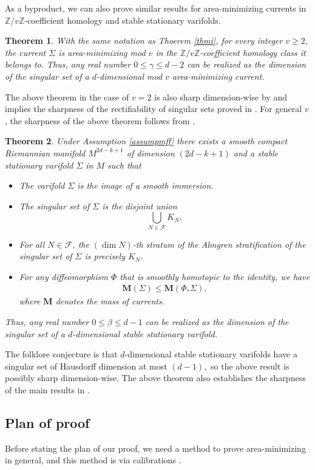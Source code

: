 \documentclass[11pt,a4paper]{amsart}
\numberwithin{equation}{section}
\newcommand{\mff}{\mathcal{F}}
\newcommand{\be}{\beta}
\newcommand{\ga}{\gamma}
\newcommand{\Si}{\Sigma}
\newcommand{\ms}{\mathbf{M}}
\newcommand{\pf}{_\ast}
\newcommand{\Z}{\mathbb{Z}}
\theoremstyle{plain}
\newtheorem{thm}{Theorem}
\theoremstyle{definition}
\numberwithin{equation}{subsection}
\begin{document}
As a byproduct, we can also prove similar results for area-minimizing currents in $\Z/v\Z$-coefficient homology and stable stationary varifolds. 
\begin{thm}\label{thmp}
With the same notation as Thoerem \ref{thmi}, for every integer $v\ge 2$, the current $\Si$ is area-minimizing mod $v$ in the $\Z/v\Z$-coefficient homology class it belongs to.    Thus, any real number $0\le \ga\le d-2$ can be realized as the dimension of the singular set of a $d$-dimensional mod $v$ area-minimizing current.
\end{thm}
The above theorem in the case of $v=2$ is also sharp dimension-wise by \cite{HFts} and implies the sharpness of the rectifiability of singular sets proved in \cite{LScy}. For general $v$, the sharpness of the above theorem follows from \cite{DMSmod}.
\begin{thm}\label{thms}Under Assumption \ref{assumpmff} there exists a smooth compact Riemannian manifold $M^{2d-k+1}$ of dimension $(2d-k+1)$ and a stable stationary varifold $\Si$ in $M$ such that
\begin{itemize}
\item The varifold $\Si$ is the image of a smooth immersion.
\item The singular set of $\Si$ is the disjoint union $$\bigcup_{N\in\mff}K_N,$$ 
\item For all $N\in \mff $, the $(\dim N)$-th stratum of the Almgren stratification of the singular set of $\Si$ is precisely $K_N.$
\item For any diffeomorphism $\Phi$ that is smoothly homotopic to the identity, we have
\begin{align*}
	\ms(\Si)\le\ms(\Phi\pf\Si),
\end{align*}where $\ms$ denotes the mass of currents.
\end{itemize}  Thus, any real number $0\le \be\le d-1$ can be realized as the dimension of the singular set of a $d$-dimensional stable stationary varifold.
\end{thm}
The folklore conjecture is that $d$-dimensional stable stationary varifolds have a singular set of Hausdorff dimension at most $(d-1),$ so the above result is possibly sharp dimension-wise. The above theorem also establishes the sharpness of the main results in \cite{NV}.
\subsection{Plan of proof}\label{planpf}
Before stating the plan of our proof, we need a method to prove area-minimizing in general, and this method is via calibrations \cite{HL}.
	
\end{document}
